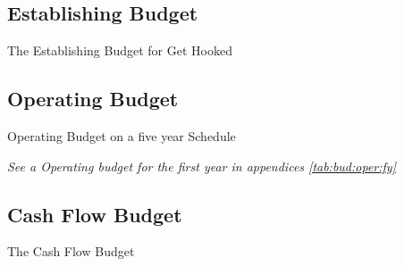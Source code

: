 \subsection{Establishing Budget}


\begin{table}[H]
\centering
\caption{The Establishing Budget for Get Hooked}
\label{tab:bud:estab}

\end{table}

\lipsum[1-2]

\subsection{Operating Budget}

\begin{table*}[t!]
\centering
\caption{Operating Budget on a five year Schedule}
\label{tab:bud:oper}

\textit{See a Operating budget for the first year in appendices \ref{tab:bud:oper:fy}}
\end{table*}


\lipsum[1-4]


\subsection{Cash Flow Budget}

\begin{table*}[t!]
\centering
\caption{The Cash Flow Budget}
\label{tab:bud:cflow}


\end{table*}

\lipsum[1-4]



